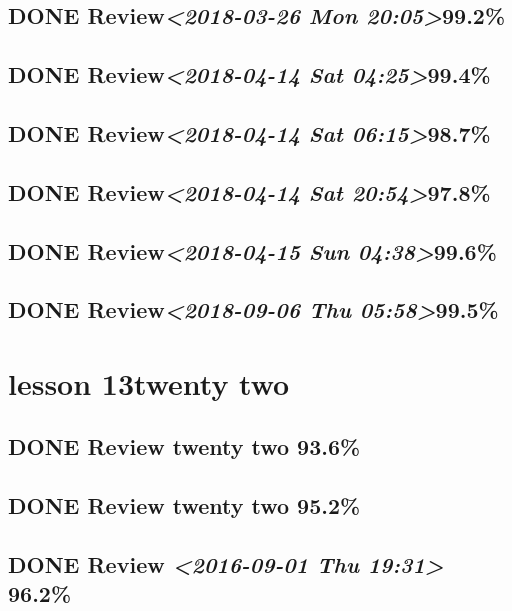 \documentclass[11pt]{ctexart}
\begin{document}
\subsection{{\bfseries\sffamily DONE} Review\textit{<2018-03-26 Mon 20:05>}99.2\%}
\label{sec:org40140ca}
\subsection{{\bfseries\sffamily DONE} Review\textit{<2018-04-14 Sat 04:25>}99.4\%}
\label{sec:org54f89a7}
\subsection{{\bfseries\sffamily DONE} Review\textit{<2018-04-14 Sat 06:15>}98.7\%}
\label{sec:org0b29c2f}
\subsection{{\bfseries\sffamily DONE} Review\textit{<2018-04-14 Sat 20:54>}97.8\%}
\label{sec:org1f3e384}
\subsection{{\bfseries\sffamily DONE} Review\textit{<2018-04-15 Sun 04:38>}99.6\%}
\label{sec:org798e285}
\subsection{{\bfseries\sffamily DONE} Review\textit{<2018-09-06 Thu 05:58>}99.5\%}
\label{sec:orgff4f00e}
\section{lesson 13twenty two}
\label{sec:org1101009}
\subsection{{\bfseries\sffamily DONE} Review twenty two 93.6\%}
\label{sec:org63de5a8}
\subsection{{\bfseries\sffamily DONE} Review twenty two 95.2\%}
\label{sec:org68cb583}

\subsection{{\bfseries\sffamily DONE} Review \textit{<2016-09-01 Thu 19:31> } 96.2\%}
\label{sec:org4aec7be}
\end{document}
